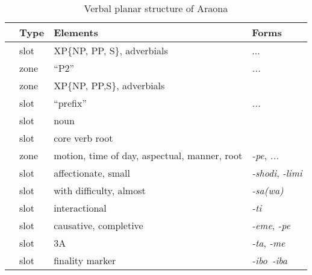 \documentclass[output=paper,hidelinks]{langscibook}
\begin{document}
\begin{table}
\caption{Verbal planar structure of Araona}
\label{tab:verbalplanar}
\begin{tabular}{Slp{7.5cm}l} \lsptoprule
	            & Type  & Elements  & Forms \\ \midrule

\label{pos:XP1}  & slot  &  XP\{NP, PP, S\}, adverbials & ...   \\

\label{pos:P2} & zone  & ``P2''  & \textit{...} \\


\label{pos:XP2} & zone  & XP\{NP, PP,S\}, adverbials  &      \\

\label{pos:vpref}   & slot  & ``prefix''   & \textit{...}     \\

\label{pos:noun} & slot      & noun           &       \\

\label{pos:vcore}    & slot    & core verb root           &       \\



\label{pos:advsuf}  & zone  & motion, time of day, aspectual, manner, root &  \textit{-pe}, \textit{...} \\

\label{pos:expressiveslot}  & slot      & affectionate, small & \textit{-shodi}, \textit{-limi}    \\

\label{pos:sawa}     & slot & with difficulty, almost & \textit{-sa(wa)}    \\

\label{pos:ti}  & slot      & interactional& \textit{-ti}   \\

\label{pos:caus}    & slot      & causative, completive  & \textit{-eme}, \textit{-pe}    \\


\label{pos:ta}  & slot      & 3A   & \textit{-ta}, \textit{-me}     \\

\label{pos:iboiba}  & slot      & finality marker   & \textit{-ibo}~\textit{-iba}  \\


\end{tabular}
\end{table}
\end{document}
